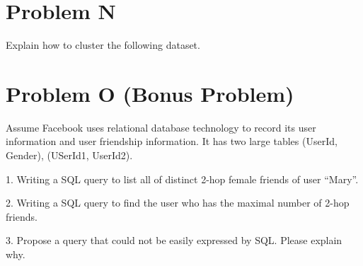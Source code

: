 \documentclass{article}
\begin{document}
\section{Problem N}
Explain how to cluster the following dataset.

\section{Problem O (Bonus Problem)}
Assume Facebook uses relational database technology to record its user information and user friendship information. It has two large tables (UserId, Gender), (USerId1, UserId2).

1. Writing a SQL query to list all of distinct 2-hop female friends of user ``Mary''.

2. Writing a SQL query to find the user who has the maximal number of 2-hop friends.

3. Propose a query that could not be easily expressed by SQL. Please explain why.
\end{document}
